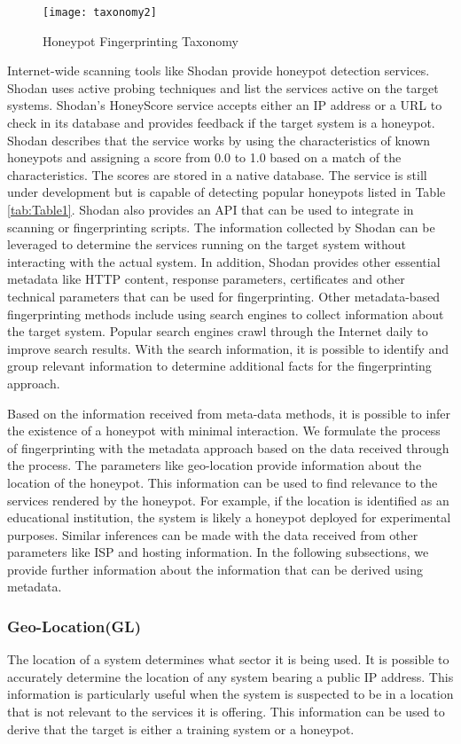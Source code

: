 \begin{figure}[t]
    \centering
    \texttt{[image: taxonomy2]}
    \caption{Honeypot Fingerprinting Taxonomy}
    \label{fig:taxonomy}
\end{figure}


Internet-wide scanning tools like Shodan provide honeypot detection services. Shodan uses active probing techniques and list the services active on the target systems. Shodan's  HoneyScore service accepts either an IP address or a URL to check in its database and provides feedback if the target system is a honeypot. Shodan describes that the service works by using the characteristics of known honeypots and assigning a score from 0.0 to 1.0 based on a match of the characteristics. The scores are stored in a native database. The service is still under development but is capable of detecting popular honeypots listed in Table \ref{tab:Table1}. Shodan also provides an API that can be used to integrate in scanning or fingerprinting scripts. The information collected by Shodan can be leveraged to determine the services running on the target system without interacting with the actual system. In addition, Shodan provides other essential metadata like HTTP content, response parameters, certificates and other technical parameters that can be used for fingerprinting. Other metadata-based fingerprinting methods include using search engines to collect information about the target system. Popular search engines crawl through the Internet daily to improve search results. With the search information, it is possible to identify and group relevant information to determine additional facts for the fingerprinting approach. 

Based on the information received from meta-data methods, it is possible to infer the existence of a honeypot with minimal interaction. We formulate the process of fingerprinting with the metadata approach based on the data received through the process. The parameters like geo-location provide information about the location of the honeypot. This information can be used to find relevance to the services rendered by the honeypot. For example, if the location is identified as an educational institution, the system is likely a honeypot deployed for experimental purposes. Similar inferences can be made with the data received from other parameters like ISP and hosting information. In the following subsections, we provide further information about the information that can be derived using metadata. 

\subsubsection{Geo-Location(GL)}
The location of a system determines what sector it is being used. It is possible to accurately determine the location of any system bearing a public IP address. This information is particularly useful when the system is suspected to be in a location that is not relevant to the services it is offering. This information can be used to derive that the target is either a training system or a honeypot. 

